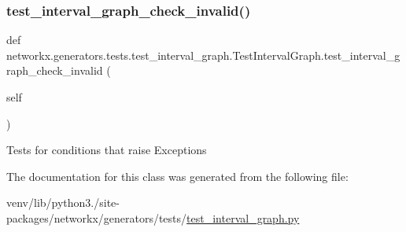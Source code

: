 \subsubsection{\texorpdfstring{test\+\_\+interval\+\_\+graph\+\_\+check\+\_\+invalid()}{test\_interval\_graph\_check\_invalid()}}
{\footnotesize\ttfamily def networkx.\+generators.\+tests.\+test\+\_\+interval\+\_\+graph.\+Test\+Interval\+Graph.\+test\+\_\+interval\+\_\+graph\+\_\+check\+\_\+invalid (\begin{DoxyParamCaption}\item[{}]{self }\end{DoxyParamCaption})}

\begin{DoxyVerb}Tests for conditions that raise Exceptions\end{DoxyVerb}
 

The documentation for this class was generated from the following file\+:\begin{DoxyCompactItemize}
\item 
venv/lib/python3./site-\/packages/networkx/generators/tests/\hyperlink{test__interval__graph_8py}{test\+\_\+interval\+\_\+graph.\+py}\end{DoxyCompactItemize}
